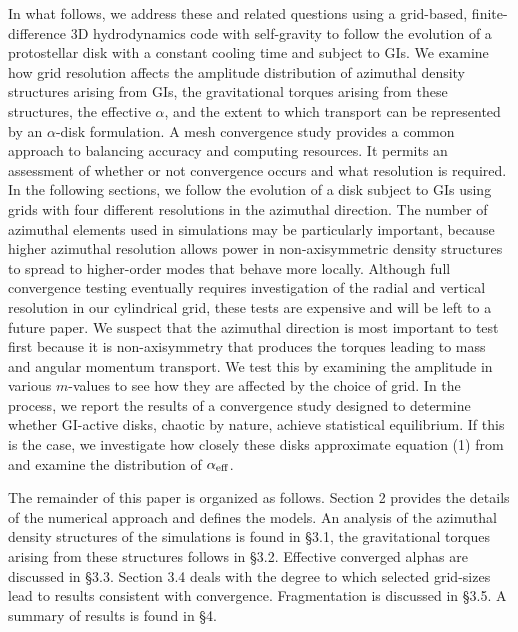 \documentclass[manuscript]{aastex}
\begin{document}
In what follows, we address these and related questions using a grid-based, finite-difference 3D hydrodynamics code with 
self-gravity to follow the evolution of a protostellar disk with a constant cooling time and subject to GIs.
We examine how grid resolution affects
the amplitude distribution of azimuthal density structures arising from GIs, the gravitational torques arising from these structures,
the effective $\alpha$, and the extent to which transport can be represented by an $\alpha$-disk formulation.
A mesh convergence study 
provides a common approach to balancing accuracy and computing resources.
It permits an assessment of whether or not convergence occurs and what resolution is required.
In the following sections, we follow the evolution of a disk subject to GIs
using grids with four different
resolutions in the azimuthal direction.  The number of azimuthal elements used in simulations
may be particularly important, because higher azimuthal resolution 
allows power in non-axisymmetric density structures to spread to higher-order modes 
that behave more locally. 
Although full convergence testing eventually requires investigation of the radial and vertical resolution in our
cylindrical grid, these tests are expensive and will be left to a future paper.  We suspect that the azimuthal
direction is most important to test first because it is non-axisymmetry that produces the torques leading
to mass and angular momentum transport.
We test this by examining the amplitude in various 
$m$-values to see how they are affected by the choice of grid.
In the process, 
we report the results of a convergence study designed to determine whether GI-active disks, chaotic by nature, achieve statistical equilibrium.   If this is the case, we investigate how closely these disks approximate equation (1) from
 \citet{gammie2001} and examine the distribution of $\alpha_{\rm{eff}}$. 

The remainder of this paper is organized as follows.  Section 2 provides the details of the numerical approach and defines the models.  An analysis of the azimuthal density structures of the simulations 
is found in \S3.1, the gravitational torques arising from these structures follows in \S3.2.  Effective converged alphas are 
discussed in \S3.3.  Section 3.4 deals with the degree to which selected grid-sizes lead to results consistent with
convergence.  Fragmentation is discussed in \S3.5.  A summary of results is found in \S4.
\end{document}
